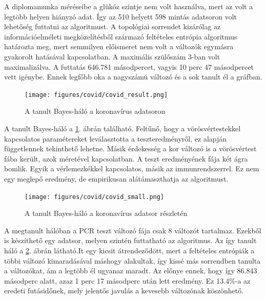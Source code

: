 A diplomamunka méréseibe a glükóz szintje nem volt használva, mert az volt a legtöbb helyen hiányzó adat. Így az 510 helyett 598 mintás adatsoron volt lehetőség futtatni az algoritmust. A topológiai sorrendet kizárólag az információelméleti megközelítésből származó feltételes entrópia algoritmus határozta meg, mert semmilyen előismeret nem volt a változók egymásra gyakorolt hatásával kapcsolatban. A maximális szülőszám 3-ban volt maximalizálva. A futtatás 646.781 másodpercet, vagyis 10 perc 47 másodpercet vett igénybe. Ennek legfőbb oka a nagyszámú változó és a sok tanult él a gráfban.

\begin{figure}[htp]
    \centering
    \texttt{[image: figures/covid/covid\_result.png]}
    \caption{A tanult Bayes-háló a koronavírus adatsoron}
    \label{fig:covid_result}
\end{figure}

A tanult Bayes-háló a \ref{fig:covid_result}. ábrán található. Feltűnő, hogy a vörösvértestekkel kapcsolatos paramétereket leválasztotta a teszteredményről, ez alapján függetlennek tekinthető lehetne. Másik érdekesség a kor változó is a vörösvértest fába került, azok méretével kapcsolatban. A teszt eredményének fája két ágra bomlik. Egyik a vérlemezkékkel kapcsolatos, másik az immunrendszerrel. Ez nem egy meglepő eredmény, de empirikusan alátámaszthatja az algoritmust.

\begin{figure}[htp]
    \centering
    \texttt{[image: figures/covid/covid\_small.png]}
    \caption{A tanult Bayes-háló a koronavírus adatsor részletén}
    \label{fig:covid_small_result}
\end{figure}

A megtanult hálóban a PCR teszt változó fája csak 8 változót tartalmaz. Ezekből is készíthető egy adatsor, melyen szintén futtatható az algoritmus. Az így tanult háló a \ref{fig:covid_small_result}. ábrán látható.It egy kicsit átrendeződött, mert a feltételes entrópiák a többi változó kimaradásával máshogy alakultak, így kissé más sorrendben tanulta a változókat, ám a legtöbb él ugyanaz maradt. Az előnye ennek, hogy így 86.843 másodperc alatt, azaz 1 perc 17 másodperc után lett eredmény. Ez 13.4\%-a az eredeti futásidőnek, mely jelentős javulás a kevesebb változónak köszönhető.

